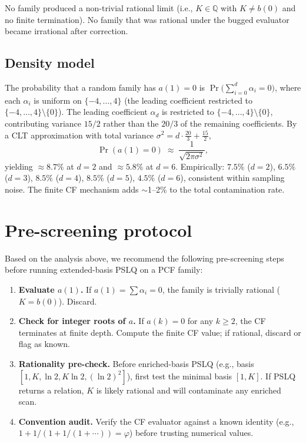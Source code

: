 \documentclass[11pt]{amsart}
\theoremstyle{definition}
\theoremstyle{remark}
\begin{document}
No family produced a non-trivial rational limit (i.e., $K\in\mathbb{Q}$
with $K\ne b(0)$ and no finite termination).
No family that was rational under the bugged evaluator became
irrational after correction.

\subsection{Density model}\label{sec:density}

The probability that a random family has $a(1)=0$ is
$\Pr\!\bigl(\sum_{i=0}^d \alpha_i = 0\bigr)$, where each $\alpha_i$ is
uniform on $\{-4,\ldots,4\}$ (the leading coefficient restricted to
$\{-4,\ldots,4\}\setminus\{0\}$).
The leading coefficient $\alpha_d$ is restricted to
$\{-4,\ldots,4\}\setminus\{0\}$, contributing variance $15/2$
rather than the $20/3$ of the remaining coefficients.
By a CLT approximation with total variance $\sigma^2 = d\cdot\tfrac{20}{3}+\tfrac{15}{2}$,
\[
  \Pr(a(1)=0) \;\approx\; \frac{1}{\sqrt{2\pi\sigma^2}},
\]
yielding $\approx 8.7\%$ at $d=2$ and $\approx 5.8\%$ at $d=6$.
Empirically: $7.5\%$ ($d=2$), $6.5\%$ ($d=3$), $8.5\%$ ($d=4$),
$8.5\%$ ($d=5$), $4.5\%$ ($d=6$), consistent within sampling noise.
The finite CF mechanism adds $\sim$1--2\% to the total contamination rate.

\section{Pre-screening protocol}\label{sec:protocol}

Based on the analysis above, we recommend the following pre-screening
steps before running extended-basis PSLQ on a PCF family:

\begin{enumerate}
  \item \textbf{Evaluate $a(1)$.}
    If $a(1) = \sum\alpha_i = 0$, the family is trivially rational
    ($K=b(0)$).  Discard.

  \item \textbf{Check for integer roots of $a$.}
    If $a(k)=0$ for any $k\ge 2$, the CF terminates at finite depth.
    Compute the finite CF value; if rational, discard or flag as known.

  \item \textbf{Rationality pre-check.}
    Before enriched-basis PSLQ
    (e.g., basis $[1, K, \ln 2, K\ln 2, (\ln 2)^2]$),
    first test the minimal basis $[1, K]$.  If PSLQ returns a relation,
    $K$ is likely rational and will contaminate any enriched scan.

  \item \textbf{Convention audit.}
    Verify the CF evaluator against a known identity
    (e.g., $1+1/(1+1/(1+\cdots)) = \varphi$)
    before trusting numerical values.
\end{enumerate}
\end{document}
